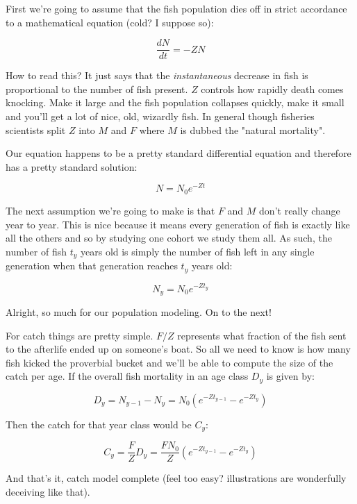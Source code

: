\documentclass[11pt,a5paper]{book}
\begin{document}
First we're going to assume that the fish population dies off in strict accordance to a mathematical equation (cold? I suppose so):

$$\frac{dN}{dt}=-ZN$$

How to read this? It just says that the \textit{instantaneous} decrease in fish is proportional to the number of fish present. $Z$ controls how rapidly death comes knocking. Make it large and the fish population collapses quickly, make it small and you'll get a lot of nice, old, wizardly fish. In general though fisheries scientists split $Z$ into $M$ and $F$ where $M$ is dubbed the "natural mortality". 
\newline

Our equation happens to be a pretty standard differential equation and therefore has a pretty standard solution:

$$N = N_0 e^{-Zt}$$

The next assumption we're going to make is that $F$ and $M$ don't really change year to year. This is nice because it means every generation of fish is exactly like all the others and so by studying one cohort we study them all. As such, the number of fish $t_y$ years old is simply the number of fish left in any single generation when that generation reaches $t_y$ years old:

$$N_y = N_0 e^{-Zt_y}$$

Alright, so much for our population modeling. On to the next!
\newline

For catch things are pretty simple. $F/Z$ represents what fraction of the fish sent to the afterlife ended up on someone's boat. So all we need to know is how many fish kicked the proverbial bucket and we'll be able to compute the size of the catch per age. If the overall fish mortality in an age class $D_y$ is given by:

$$D_y = N_{y-1} - N_y =N_0(e^{-Zt_{y-1}}- e^{-Zt_y})$$

Then the catch for that year class would be $C_y$:

$$C_y = \frac{F}{Z} D_y = \frac{FN_0}{Z}(e^{-Zt_{y-1}}- e^{-Zt_y})$$

And that's it, catch model complete (feel too easy? illustrations are wonderfully deceiving like that).
\newline
\end{document}
